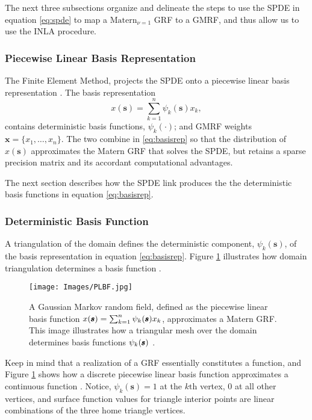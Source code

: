 The next three subsections organize and delineate the steps to use the SPDE in equation \ref{eq:spde} to map a $\text{Matern}_{\nu = 1}$ GRF to a GMRF, and thus allow us to use the INLA procedure.

\subsubsection{Piecewise Linear Basis Representation}
The Finite Element Method, projects the SPDE onto a piecewise linear basis representation \citep{Simpson2012}. The basis representation
\begin{equation} \label{eq:basisrep}
x(\pmb{s}) = \sum_{k=1}^{n} \psi_{k}(\pmb{s})x_{k},
\end{equation}
contains deterministic basis functions, $\psi_{k}(\cdot)$; and GMRF weights $\pmb{x} = \{x_{1},\dots,x_{n}\}$. The two combine in \ref{eq:basisrep} so that the distribution of $x(\pmb{s})$ approximates the Matern GRF that solves the SPDE, but retains a sparse precision matrix and its accordant computational advantages. 

The next section describes how the SPDE link produces the the deterministic basis functions in equation \ref{eq:basisrep}.

\subsubsection{Deterministic Basis Function}

A triangulation of the domain defines the deterministic component, $\psi_{k}(\pmb{s})$, of the basis representation in equation \ref{eq:basisrep}. Figure \ref{fig:basis} illustrates how domain triangulation determines a basis function \citep{Simpson2012}.
  \begin{figure}[H]
	\centering 
	\texttt{[image: Images/PLBF.jpg]}
	\caption{A Gaussian Markov random field, defined as the piecewise linear basis function $  x(\pmb{s}) = \sum_{k=1}^{n} \protect\psi_{k}(\pmb{s})x_{k}$, approximates a Matern GRF. This image illustrates how a triangular mesh over the domain determines basis functions $\protect\psi_{k}(\pmb{s})$ 
	\citep{Simpson2012}.}
	\label{fig:basis}
	\end{figure}
Keep in mind that a realization of a GRF essentially constitutes a function, and Figure \ref{fig:basis} shows how a discrete piecewise linear basis function approximates a continuous function \citep{Simpson2012}. Notice, $\psi_{k}(\pmb{s}) = 1$ at the $k\text{th}$ vertex, $0$ at all other vertices, and surface function values for triangle interior points are linear combinations of the three home triangle vertices.
 
